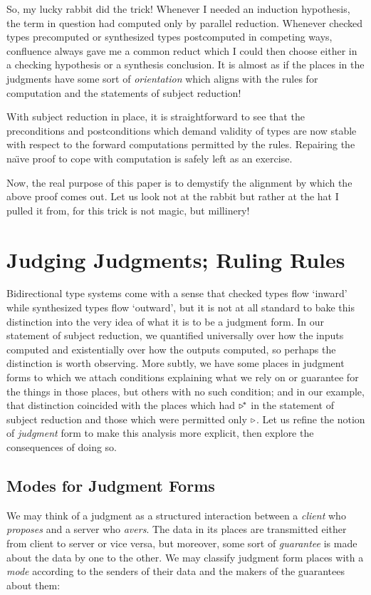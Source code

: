 \documentclass[format=acmsmall, screen, review, anonymous, timestamp]{acmart}
\begin{document}
So, my lucky rabbit did the trick! Whenever I needed an induction hypothesis, the term in question had computed only by parallel reduction. Whenever checked types precomputed or synthesized types postcomputed in competing ways, confluence always gave me a common reduct which I could then choose either in a checking hypothesis or a synthesis conclusion. It is almost as if the places in the judgments have some sort of \emph{orientation} which aligns with the rules for computation and the statements of subject reduction!

With subject reduction in place, it is straightforward to see that the preconditions and postconditions which demand validity of types are now stable with respect to the forward computations permitted by the rules. Repairing the na\"\i{}ve proof to cope with computation is safely left as an exercise.

Now, the real purpose of this paper is to demystify the alignment by which the above proof comes out. Let us look not at the rabbit but rather at the hat I pulled it from, for this trick is not magic, but millinery!


\section{Judging Judgments; Ruling Rules}

Bidirectional type systems come with a sense that checked types flow `inward' while synthesized types flow `outward', but it is not at all standard to bake this distinction into the very idea of what it is to be a judgment form. In our statement of subject reduction, we quantified universally over how the inputs computed and existentially over how the outputs computed, so perhaps the distinction is worth observing. More subtly, we have some places in judgment forms to which we attach conditions explaining what we rely on or guarantee for the things in those places, but others with no such condition; and in our example, that distinction coincided with the places which had $\triangleright^{\!\ast}$ in the statement of subject reduction and those which were permitted only $\triangleright$. Let us refine the notion of \emph{judgment} form to make this analysis more explicit, then explore the consequences of doing so.


\subsection{Modes for Judgment Forms}

We may think of a judgment as a structured interaction between a \emph{client} who \emph{proposes} and a server who \emph{avers}. The data in its places are transmitted either from client to server or vice versa, but moreover, some sort of \emph{guarantee} is made about the data by one to the other. We may classify judgment form places with a \emph{mode} according to the senders of their data and the makers of the guarantees about them:
\end{document}
